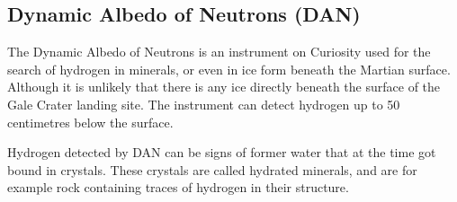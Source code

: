 \subsection*{Dynamic Albedo of Neutrons (DAN)}
The Dynamic Albedo of Neutrons is an instrument on Curiosity used for the search of hydrogen in minerals, or even in ice form beneath the Martian surface.
Although it is unlikely that there is any ice directly beneath the surface of the Gale Crater landing site.
The instrument can detect hydrogen up to 50 centimetres below the surface.

Hydrogen detected by DAN can be signs of former water that at the time got bound in crystals.
These crystals are called hydrated minerals, and are for example rock containing traces of hydrogen in their structure.